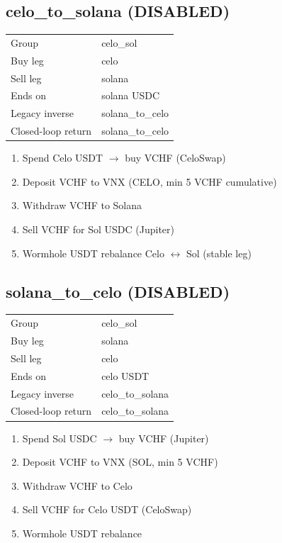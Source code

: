 \documentclass[11pt,a4paper]{article}
\begin{document}
\subsection*{\textcolor{warnred}{celo\_to\_solana} (DISABLED)}
\begin{tabular}{@{}ll@{}}
Group & celo\_sol \\
Buy leg & celo \\
Sell leg & solana \\
Ends on & solana USDC \\
Legacy inverse & solana\_to\_celo \\
Closed-loop return & solana\_to\_celo \\
\end{tabular}
\begin{enumerate}[nosep,leftmargin=*]
\item Spend Celo USDT $\rightarrow$ buy VCHF (CeloSwap)
\item Deposit VCHF to VNX (CELO, min 5 VCHF cumulative)
\item Withdraw VCHF to Solana
\item Sell VCHF for Sol USDC (Jupiter)
\item Wormhole USDT rebalance Celo $\leftrightarrow$ Sol (stable leg)
\end{enumerate}
\subsection*{\textcolor{warnred}{solana\_to\_celo} (DISABLED)}
\begin{tabular}{@{}ll@{}}
Group & celo\_sol \\
Buy leg & solana \\
Sell leg & celo \\
Ends on & celo USDT \\
Legacy inverse & celo\_to\_solana \\
Closed-loop return & celo\_to\_solana \\
\end{tabular}
\begin{enumerate}[nosep,leftmargin=*]
\item Spend Sol USDC $\rightarrow$ buy VCHF (Jupiter)
\item Deposit VCHF to VNX (SOL, min 5 VCHF)
\item Withdraw VCHF to Celo
\item Sell VCHF for Celo USDT (CeloSwap)
\item Wormhole USDT rebalance
\end{enumerate}
\end{document}
